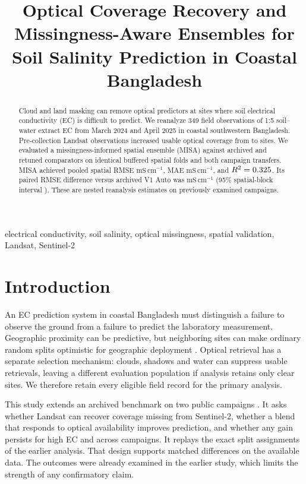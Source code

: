 \documentclass[conference]{IEEEtran}
\newcommand{\unit}{\ensuremath{\mathrm{mS\,cm^{-1}}}}
\begin{document}
\title{Optical Coverage Recovery and Missingness-Aware Ensembles for Soil Salinity Prediction in Coastal Bangladesh}
\author{
}
\maketitle

\begin{abstract}
Cloud and land masking can remove optical predictors at sites where soil electrical conductivity (EC) is difficult to predict. We reanalyze 349 field observations of 1:5 soil--water extract EC from March 2024 and April 2025 in coastal southwestern Bangladesh. Pre-collection Landsat observations increased usable optical coverage from \SentinelCount{} to \AnyCount{} sites. We evaluated a missingness-informed spatial ensemble (MISA) against archived and retuned comparators on identical buffered spatial folds and both campaign transfers. MISA achieved pooled spatial RMSE \MisaRmse{} \unit{}, MAE \MisaMae{} \unit{}, and $R^2=0.325$. Its paired RMSE difference versus archived V1 Auto was \DeltaVone{} \unit{} (95\% spatial-block interval \DeltaVoneCI). \AbstractVerdict{} These are nested reanalysis estimates on previously examined campaigns.
\end{abstract}
\begin{IEEEkeywords}
electrical conductivity, soil salinity, optical missingness, spatial validation, Landsat, Sentinel-2
\end{IEEEkeywords}

\section{Introduction}
An EC prediction system in coastal Bangladesh must distinguish a failure to observe the ground from a failure to predict the laboratory measurement. Geographic proximity can be predictive, but neighboring sites can make ordinary random splits optimistic for geographic deployment \cite{roberts}. Optical retrieval has a separate selection mechanism: clouds, shadows and water can suppress usable retrievals, leaving a different evaluation population if analysis retains only clear sites. We therefore retain every eligible field record for the primary analysis.

This study extends an archived benchmark on two public campaigns \cite{data24,data25}. It asks whether Landsat can recover coverage missing from Sentinel-2, whether a blend that responds to optical availability improves prediction, and whether any gain persists for high EC and across campaigns. It replays the exact split assignments of the earlier analysis. That design supports matched differences on the available data. The outcomes were already examined in the earlier study, which limits the strength of any confirmatory claim.
\end{document}
